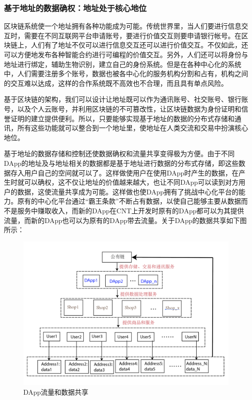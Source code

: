 \documentclass[a4paper,12pt]{article}
\begin{document}
\subsubsection{基于地址的数据确权：地址处于核心地位}

区块链系统使一个地址拥有各种功能成为可能。传统世界里，当人们要进行信息交互时，需要在不同互联网平台申请账号，要进行价值交互则要申请银行帐号。在区块链上，人们有了地址不仅可以进行信息交互还可以进行价值交互。不仅如此，还可以方便地发布各种智能合约进行可编程的价值交互。另外，人们还可以将身份与地址进行绑定，辅助生物识别，建立自己的身份系统。但是在各种中心化的系统中，人们需要注册多个账号，数据也被各中心化的服务机构分割和占有，机构之间的交互难以达成，这样的合作系统既不高效也不合理，而且具有单点风险。

基于区块链的架构，我们可以设计让地址既可以作为通讯账号、社交账号、银行账号，以及个人云账号，并利用区块链的不可篡改性，让区块链数据为身份证明和信誉证明的建立提供便利。所以，只要能够实现基于地址的数据的分布式存储和通讯，所有这些功能就可以整合到一个地址里，使地址在人类交流和交易中扮演核心地位。

基于地址的数据存储和控制还使数据确权和流量共享变得极为方便。由于不同DApp的地址及与地址相关的数据都是基于地址进行数据的分布式存储，即这些数据存入用户自己的空间就可以了。这样做使用户在使用DApp时产生的数据，在产生时就可以确权，这不仅让地址的价值越来越大，也让不同DApp可以读到对方用户的数据，这使流量共享成为可能。这样做也使DApp拥有了挑战中心化平台的能力。原有的中心化平台通过“霸王条款”不断占有数据，以使自己能够主要从数据而不是服务中赚取收入，而新的DApp在CNT上开发时原有的DApp都可以为其提供流量，而新的DApp也可以为原有的DApp带去流量。关于DApp的数据共享如下图所示：



\begin {figure} [htbp]
\centering \includegraphics [width = 5in] {pic_cn/address and data.png}
\caption {DApp流量和数据共享} \label {fig: address_and_data}
\end {figure}
\end{document}
